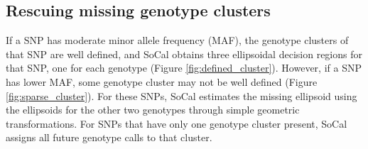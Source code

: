 \documentclass{scrartcl}
\begin{document}
\subsection{Rescuing missing genotype clusters}

\par
If a SNP has moderate minor allele frequency (MAF), the genotype clusters of
that SNP are well defined, and SoCal obtains three ellipsoidal decision
regions for that SNP, one for each genotype (Figure \ref{fig:defined_cluster}).
However, if a SNP has lower MAF, some genotype cluster may not be well defined 
(Figure \ref{fig:sparse_cluster}).
For these SNPs, SoCal estimates the missing ellipsoid using the ellipsoids for
the other two genotypes through simple geometric transformations.
For SNPs that have only one genotype cluster present, SoCal assigns all future
genotype calls to that cluster.
\end{document}
